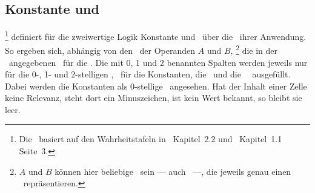{\section[Aussagenlogik]{\Aussagenlogik}%
\beginsection          {\Aussagenlogik}
\label              {sec:Aussagenlogik}

\subsection[Konstante und Operationen]{Konstante und \Operationen}%
\label               {sub:Operationen}

%
\footnote{%
	Die \tablename\ basiert auf den Wahrheitstafeln in~\cite{bib:JunktorMoeglich} Kapitel~2.2 und~\cite{bib:Rautenberg} Kapitel~1.1 Seite~3.
}
definiert für die zweiwertige Logik Konstante und \Junktoren\ über die \Wahrheitswerte\ ihrer Anwendung.
So ergeben sich, abhängig von den \Wahrheitswerten\ der Operanden $A$ und $B$,%
\footnote{%
	$A$ und $B$ können hier beliebige \Aussagen\ sein --- auch \Formeln\ ---, die jeweils genau einen \Wahrheitswert\ repräsentieren.
}
die in der \tablename\ angegebenen \Wahrheitswerte\ für die \Operationen.
Die mit 0, 1 und 2 benannten Spalten werden jeweils nur für die 0-, 1- und 2-stelligen \Junktoren, \textdh\ für die Konstanten, die \unaeren\ und die \binaeren\ \Junktoren\ ausgefüllt.
Dabei werden die Konstanten als 0-stellige \Junktoren\ angesehen.
Hat der Inhalt einer Zelle keine Relevanz, steht dort ein Minuszeichen, ist kein Wert bekannt, so bleibt sie leer.

\newcommand{\alleMoeglichenJunktoren}{
	Um vollständig zu sein, \textdh\ alle 22 möglichen Kombinationen von \Wahrheitswerten\ für höchstens zwei Variable zu berücksichtigen, enthält die \tablename\ auch viele ungebräuchliche \Symbole\ und \Operationen.
	\Junktoren\ ohne Angabe einer Priorität sind in diesem Dokument nicht weiter von Interesse.
	--- Im Folgenden werden von den in der Tabelle aufgeführten \Junktoren\ nur noch \defSym{\OjkFalse}, \defSym{\OjkTrue}, \defSym{\OjkNot}, \defSym{\OjkAnd}, \defSym{\OjkOr}, \defSym{\OjkImp}, \defSym{\OjkRep}, \defSym{\OjkEquiv}, \defSym{\OjkNand}, \defSym{\OjkNor} und \defSym{\OjkXor} verwendet.
}

}
